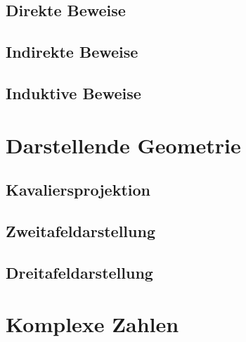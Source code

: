 \documentclass[12pt,a4paper]{scrbook}
\begin{document}
\section{Direkte Beweise}

\section{Indirekte Beweise}

\section{Induktive Beweise}

\chapter{Darstellende Geometrie}
\section{Kavaliersprojektion}
\section{Zweitafeldarstellung}
\section{Dreitafeldarstellung}

\chapter{Komplexe Zahlen}
\end{document}
